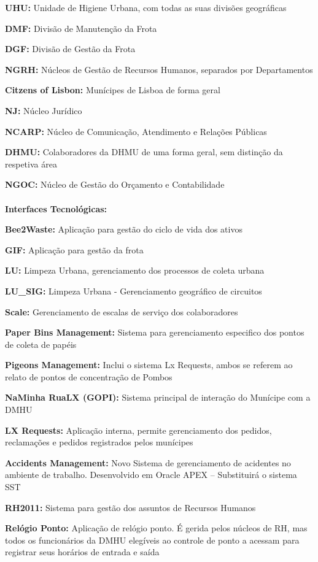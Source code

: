 \documentclass[12pt,a4paper,final]{article}
\begin{document}
    \textbf{UHU:} Unidade de Higiene Urbana, com todas as suas divisões geográficas

    \textbf{DMF:} Divisão de Manutenção da Frota

    \textbf{DGF:} Divisão de Gestão da Frota

    \textbf{NGRH:} Núcleos de Gestão de Recursos Humanos, separados por Departamentos

    \textbf{Citzens of Lisbon:} Munícipes de Lisboa de forma geral

    \textbf{NJ:} Núcleo Jurídico

    \textbf{NCARP:} Núcleo de Comunicação, Atendimento e Relações Públicas

    \textbf{DHMU:} Colaboradores da DHMU de uma forma geral, sem distinção da respetiva área

    \textbf{NGOC:} Núcleo de Gestão do Orçamento e Contabilidade
\\
    \\
    \textbf{Interfaces Tecnológicas:}

    \textbf{Bee2Waste:} Aplicação para gestão do ciclo de vida dos ativos

    \textbf{GIF:} Aplicação para gestão da frota

    \textbf{LU:} Limpeza Urbana, gerenciamento dos processos de coleta urbana

    \textbf{LU\_SIG:} Limpeza Urbana - Gerenciamento geográfico de circuitos

    \textbf{Scale:} Gerenciamento de escalas de serviço dos colaboradores

    \textbf{Paper Bins Management:} Sistema para gerenciamento especifico dos pontos de coleta de papéis

    \textbf{Pigeons Management:} Inclui o sistema Lx Requests, ambos se referem ao relato de pontos de concentração
    de Pombos

    \textbf{NaMinha RuaLX (GOPI):} Sistema principal de interação do Munícipe com a DMHU

    \textbf{LX Requests:} Aplicação interna, permite gerenciamento dos pedidos, reclamações e pedidos registrados pelos munícipes

    \textbf{Accidents Management:} Novo Sistema de gerenciamento de acidentes no ambiente de trabalho. Desenvolvido em Oracle APEX – Substituirá o sistema SST

    \textbf{RH2011:} Sistema para gestão dos assuntos de Recursos Humanos

    \textbf{Relógio Ponto:} Aplicação de relógio ponto. É gerida pelos núcleos de RH, mas todos os funcionários da DMHU elegíveis ao controle de ponto a acessam para registrar seus horários de entrada e saída
\end{document}
